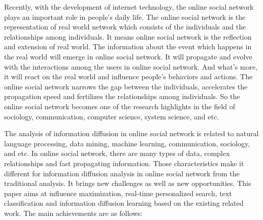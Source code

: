 \begin{eabstract}
Recently, with the development of internet technology, the online social network plays an important role in people's daily life. The online social network is the representation of real world network which consists of the individuals and the relationships among individuals. It means online social network is the reflection and extension of real world. The information about the event which happens in the real world will emerge in online social network. It will propagate and evolve with the interactions among the users in online social network. And what's more, it will react on the real world and influence people's behaviors and actions. The online social network narrows the gap between the individuals, accelerates the propagation speed and fertilizes the relationships among individuals. So the online social network becomes one of the research highlights in the field of sociology, communication, computer science, system science, and etc.

The analysis of information diffusion in online social network is related to natural language processing, data mining, machine learning, communication, sociology, and etc. In online social network, there are many types of data, complex relationships and fast propagating information. Those characteristics make it different for information diffusion analysis in online social network from the traditional analysis. It brings new challenges as well as new opportunities. This paper aims at influence maximization, real-time personalized search, text classification and information diffusion learning based on the existing related work. The main achievements are as follows:


\end{eabstract}
